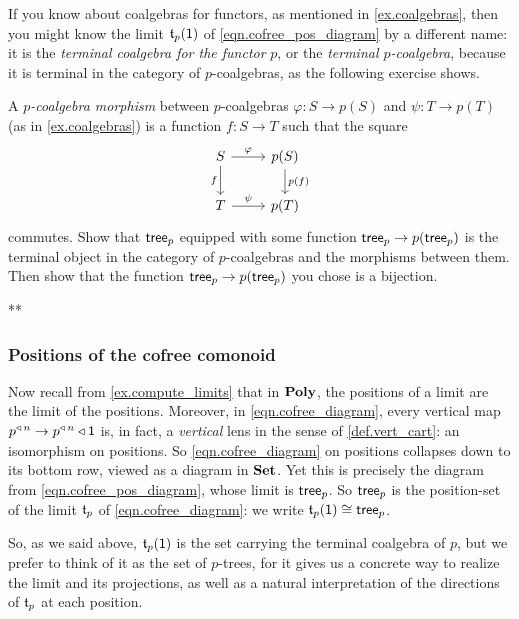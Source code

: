 \documentclass[Book-Poly]{subfiles}
\begin{document}
If you know about coalgebras for functors, as mentioned in \cref{ex.coalgebras}, then you might know the limit $\mathfrak{t}_p(\textsf{1})$ of \eqref{eqn.cofree_pos_diagram} by a different name: it is the \emph{terminal coalgebra for the functor} $p$, or the \emph{terminal $p$-coalgebra}, because it is terminal in the category of $p$-coalgebras, as the following exercise shows.

\begin{exercise}
A \emph{$p$-coalgebra morphism} between $p$-coalgebras $\varphi\colon S\to p(S)$ and $\psi\colon T\to p(T)$ (as in \cref{ex.coalgebras}) is a function $f\colon S\to T$ such that the square
\[
\begin{tikzcd}
    S \ar[r,"\varphi"] \ar[d,"f"'] & p(S) \ar[d,"p(f)"] \\
    T \ar[r,"\psi"] & p(T)
\end{tikzcd}
\]
commutes.
Show that $\mathsf{tree}_p$ equipped with some function $\mathsf{tree}_p\to p(\mathsf{tree}_p)$ is the terminal object in the category of $p$-coalgebras and the morphisms between them.
Then show that the function $\mathsf{tree}_p\to p(\mathsf{tree}_p)$ you chose is a bijection.
\begin{solution}
**
\end{solution}
\end{exercise}

\subsubsection{Positions of the cofree comonoid}

Now recall from \cref{ex.compute_limits} that in $\mathbf{Poly}$, the positions of a limit are the limit of the positions.
Moreover, in \eqref{eqn.cofree_diagram}, every vertical map $p^{\mathbin{\triangleleft}\,n}\to p^{\mathbin{\triangleleft}\,n}\mathbin{\triangleleft}\textsf{1}$ is, in fact, a \emph{vertical} lens in the sense of \cref{def.vert_cart}: an isomorphism on positions.
So \eqref{eqn.cofree_diagram} on positions collapses down to its bottom row, viewed as a diagram in $\mathbf{Set}$.
Yet this is precisely the diagram from \eqref{eqn.cofree_pos_diagram}, whose limit is $\mathsf{tree}_p$.
So $\mathsf{tree}_p$ is the position-set of the limit $\mathfrak{t}_p$ of \eqref{eqn.cofree_diagram}: we write $\mathfrak{t}_p(\textsf{1})\cong\mathsf{tree}_p$.

So, as we said above, $\mathfrak{t}_p(\textsf{1})$ is the set carrying the terminal coalgebra of $p$, but  we prefer to think of it as the set of $p$-trees, for it gives us a concrete way to realize the limit and its projections, as well as a natural interpretation of the directions of $\mathfrak{t}_p$ at each position.
\end{document}
